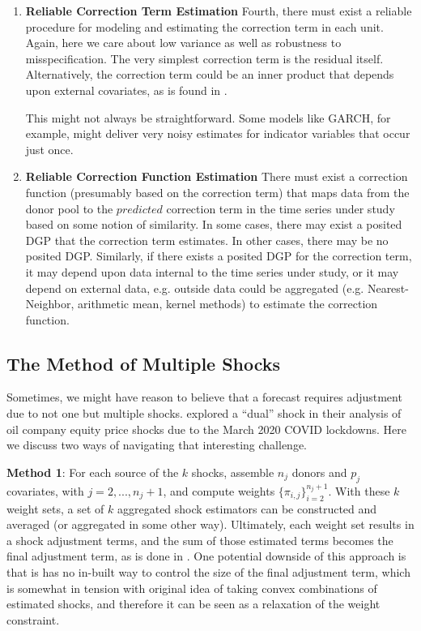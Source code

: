 \documentclass{uiucthesis2021}
\theoremstyle{definition}
\begin{document}
\begin{enumerate}
  \item \textbf{Reliable Correction Term Estimation} Fourth, there must exist a reliable procedure for modeling and estimating the correction term in each unit.  Again, here we care about low variance as well as robustness to misspecification.  The very simplest correction term is the residual itself.  Alternatively, the correction term could be an inner product that depends upon external covariates, as is found in \cite[][]{lin2021minimizing}\cite[][]{lundquist2024volatility}.
  
  This might not always be straightforward.  Some models like GARCH, for example, might deliver very noisy estimates for indicator variables that occur just once.
  
  \item \textbf{Reliable Correction Function Estimation} There must exist a correction function (presumably based on the correction term) that maps data from the donor pool to the $\textit{predicted}$ correction term in the time series under study based on some notion of similarity.  In some cases, there may exist a posited DGP that the correction term estimates.  In other cases, there may be no posited DGP.  Similarly, if there exists a posited DGP for the correction term, it may depend upon data internal to the time series under study, or it may depend on external data, e.g. outside data could be aggregated (e.g. Nearest-Neighbor, arithmetic mean, kernel methods) to estimate the correction function.
  
  \end{enumerate}
  
  \subsection{The Method of Multiple Shocks}
  
  Sometimes, we might have reason to believe that a forecast requires adjustment due to not one but multiple shocks.  \cite[][]{lin2021minimizing} explored a ``dual'' shock in their analysis of oil company equity price shocks due to the March 2020 COVID lockdowns.  Here we discuss two ways of navigating that interesting challenge.
  
  \textbf{Method 1}: For each source of the $k$ shocks, assemble $n_{j}$ donors and $p_{j}$ covariates, with $j=2,...,n_{j}+1$, and compute weights $\{\pi_{i,j}\}^{n_{j}+1}_{i=2}$.  With these $k$ weight sets, a set of $k$ aggregated shock estimators can be constructed and averaged (or aggregated in some other way).  Ultimately, each weight set results in a shock adjustment terms, and the sum of those estimated terms becomes the final adjustment term, as is done in \cite[][]{lin2021minimizing}.  One potential downside of this approach is that is has no in-built way to control the size of the final adjustment term, which is somewhat in tension with original idea of taking convex combinations of estimated shocks, and therefore it can be seen as a relaxation of the weight constraint.
  
\end{document}
